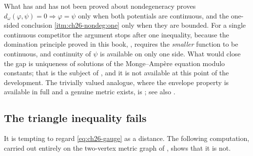 \begin{warning}{What has and has not been proved about nondegeneracy}
 proves \(d_\omega(\varphi,\psi)=0
\Rightarrow\varphi=\psi\) only when both potentials are continuous, and the
one-sided conclusion \cref{itm:ch26-nondeg:one} only when they are bounded.
For a single continuous competitor the argument stops after one inequality,
because the domination principle proved in this book,
, requires the \emph{smaller}
function to be continuous, and continuity of \(\psi\) is available on only
one side.  What would close the gap is uniqueness of solutions of the
Monge--Amp\`ere equation modulo constants; that is the subject of
, and it is not available at this point of the
development.  The trivially valued analogue, where the envelope property is
available in full and a genuine metric exists, is
; see also \cite[\S12]{BJ22}.
\end{warning}

\subsection{The triangle inequality fails}
\label{sec:ch26-triangle}

It is tempting to regard \eqref{eq:ch26-gauge} as a distance.  The following
computation, carried out entirely on the two-vertex metric graph of
, shows that it is not.

